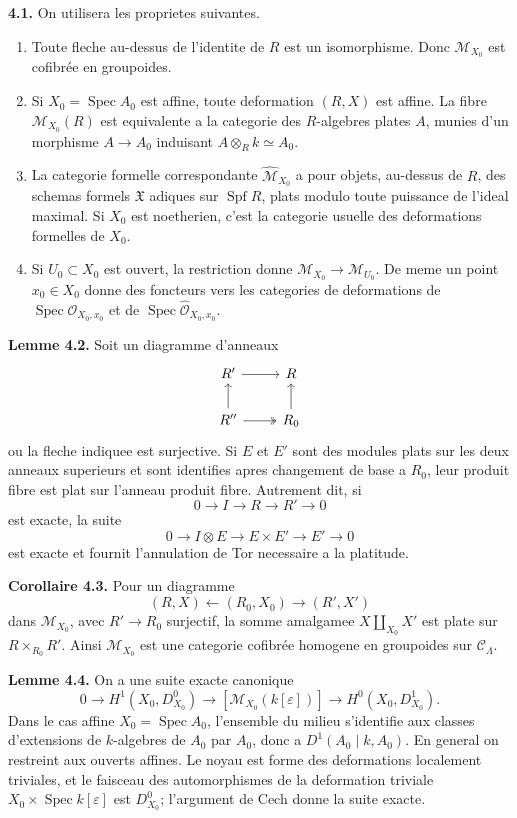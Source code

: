 \documentclass[11pt]{article}
\providecommand{\Spec}{\operatorname{Spec}}
\providecommand{\Spf}{\operatorname{Spf}}
\begin{document}
\textbf{4.1.} On utilisera les proprietes suivantes.
\begin{enumerate}[label=(\alph*)]
\item Toute fleche au-dessus de l'identite de \(R\) est un isomorphisme. Donc \(\mathcal M_{X_0}\) est cofibrée en groupoides.
\item Si \(X_0=\Spec A_0\) est affine, toute deformation \((R,X)\) est affine. La fibre \(\mathcal M_{X_0}(R)\) est equivalente a la categorie des \(R\)-algebres plates \(A\), munies d'un morphisme \(A\to A_0\) induisant \(A\otimes_R k\simeq A_0\).
\item La categorie formelle correspondante \(\widehat{\mathcal M}_{X_0}\) a pour objets, au-dessus de \(R\), des schemas formels \(\mathfrak X\) adiques sur \(\Spf R\), plats modulo toute puissance de l'ideal maximal. Si \(X_0\) est noetherien, c'est la categorie usuelle des deformations formelles de \(X_0\).
\item Si \(U_0\subset X_0\) est ouvert, la restriction donne \(\mathcal M_{X_0}\to\mathcal M_{U_0}\). De meme un point \(x_0\in X_0\) donne des foncteurs vers les categories de deformations de \(\Spec \mathcal O_{X_0,x_0}\) et de \(\Spec \widehat{\mathcal O}_{X_0,x_0}\).
\end{enumerate}

\textbf{Lemme 4.2.} Soit un diagramme d'anneaux
\[
\begin{tikzcd}
 R' \arrow[r] & R\\
 R'' \arrow[u] \arrow[r,two heads] & R_0 \arrow[u]
\end{tikzcd}
\]
ou la fleche indiquee est surjective. Si \(E\) et \(E'\) sont des modules plats sur les deux anneaux superieurs et sont identifies apres changement de base a \(R_0\), leur produit fibre est plat sur l'anneau produit fibre. Autrement dit, si
\[
 0\to I\to R\to R'\to 0
\]
est exacte, la suite
\[
 0\to I\otimes E\to E\times E'\to E'\to 0
\]
est exacte et fournit l'annulation de Tor necessaire a la platitude.

\textbf{Corollaire 4.3.} Pour un diagramme
\[
 (R,X)\longleftarrow(R_0,X_0)\longrightarrow(R',X')
\]
dans \(\mathcal M_{X_0}\), avec \(R'\to R_0\) surjectif, la somme amalgamee \(X\amalg_{X_0}X'\) est plate sur \(R\times_{R_0}R'\). Ainsi \(\mathcal M_{X_0}\) est une categorie cofibrée homogene en groupoides sur \(\mathcal C_\Lambda\).

\textbf{Lemme 4.4.} On a une suite exacte canonique
\[
 0\to H^1(X_0,D^0_{X_0})\to [\mathcal M_{X_0}(k[\varepsilon])]
 \to H^0(X_0,D^1_{X_0}).
\]
Dans le cas affine \(X_0=\Spec A_0\), l'ensemble du milieu s'identifie aux classes d'extensions de \(k\)-algebres de \(A_0\) par \(A_0\), donc a \(D^1(A_0\mid k,A_0)\). En general on restreint aux ouverts affines. Le noyau est forme des deformations localement triviales, et le faisceau des automorphismes de la deformation triviale \(X_0\times\Spec k[\varepsilon]\) est \(D^0_{X_0}\); l'argument de Cech donne la suite exacte.
\end{document}
